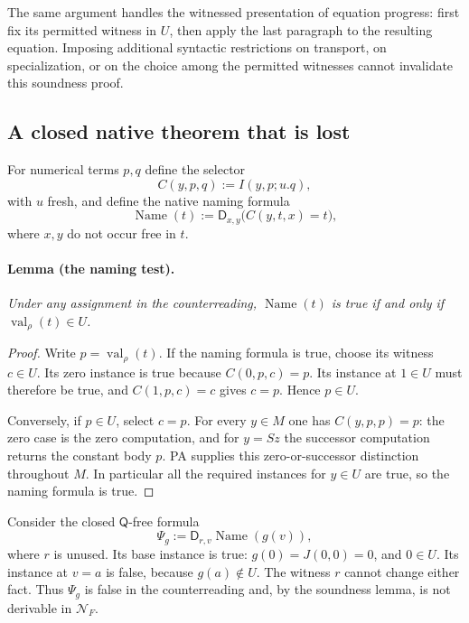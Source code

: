 The same argument handles the witnessed presentation of equation progress:
first fix its permitted witness in $U$, then apply the last paragraph to
the resulting equation.  Imposing additional syntactic restrictions on
transport, on specialization, or on the choice among the permitted
witnesses cannot invalidate this soundness proof.

\subsection{A closed native theorem that is lost}

For numerical terms $p,q$ define the selector
\[
 C(y,p,q):=I(y,p;u.q),
\]
with $u$ fresh, and define the native naming formula
\[
 \operatorname{Name}(t)
 :=\mathsf D_{x,y}\bigl(C(y,t,x)=t\bigr),
\]
where $x,y$ do not occur free in $t$.

\paragraph{Lemma (the naming test).}
\emph{Under any assignment in the counterreading,
$\operatorname{Name}(t)$ is true if and only if
$\operatorname{val}_{\rho}(t)\in U$.}

\begin{proof}
Write $p=\operatorname{val}_{\rho}(t)$.  If the naming formula is true,
choose its witness $c\in U$.  Its zero instance is true because
$C(0,p,c)=p$.  Its instance at $1\in U$ must therefore be true, and
$C(1,p,c)=c$ gives $c=p$.  Hence $p\in U$.

Conversely, if $p\in U$, select $c=p$.  For every $y\in M$ one has
$C(y,p,p)=p$: the zero case is the zero computation, and for $y=Sz$ the
successor computation returns the constant body $p$.  PA supplies this
zero-or-successor distinction throughout $M$.  In particular all the
required instances for $y\in U$ are true, so the naming formula is true.
\end{proof}

Consider the closed $\mathsf Q$-free formula
\begin{equation}
 \Psi_g:=\mathsf D_{r,v}\operatorname{Name}(g(v)),
 \label{eq:finite-menu-lost-formula}
\end{equation}
where $r$ is unused.  Its base instance is true: $g(0)=J(0,0)=0$, and
$0\in U$.  Its instance at $v=a$ is false, because $g(a)\notin U$.
The witness $r$ cannot change either fact.  Thus $\Psi_g$ is false in the
counterreading and, by the soundness lemma, is not derivable in
$\mathcal N_F$.


